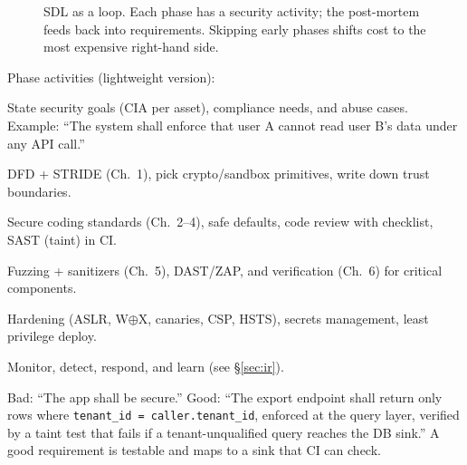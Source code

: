 \begin{figure}[h]\centering
{}
\caption{SDL as a loop. Each phase has a security activity; the post-mortem feeds back into requirements. Skipping early phases shifts cost to the most expensive right-hand side.}
\label{fig:sdl-loop}
\end{figure}

Phase activities (lightweight version):
\begin{description}[leftmargin=1.2em,itemsep=0.30em]
    \item[Requirements] State security goals (CIA per asset), compliance needs, and abuse cases. Example: ``The system shall enforce that user A cannot read user B's data under any API call.''
    \item[Design] DFD + STRIDE (Ch.~1), pick crypto/sandbox primitives, write down trust boundaries.
    \item[Implementation] Secure coding standards (Ch.~2--4), safe defaults, code review with checklist, SAST (taint) in CI.
    \item[Verification] Fuzzing + sanitizers (Ch.~5), DAST/ZAP, and verification (Ch.~6) for critical components.
    \item[Release] Hardening (ASLR, W$\oplus$X, canaries, CSP, HSTS), secrets management, least privilege deploy.
    \item[Response] Monitor, detect, respond, and learn (see \S\ref{sec:ir}).
\end{description}

\begin{example}
Bad: ``The app shall be secure.'' Good: ``The export endpoint shall return only rows where \texttt{tenant\_id = caller.tenant\_id}, enforced at the query layer, verified by a taint test that fails if a tenant-unqualified query reaches the DB sink.'' A good requirement is testable and maps to a sink that CI can check.

\end{example}

